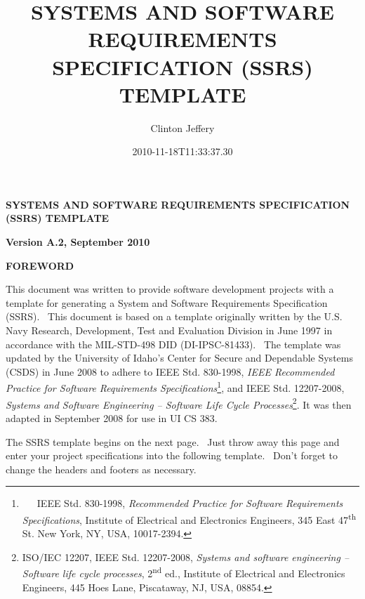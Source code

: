 \documentclass[twoside,letterpaper]{article}
\title{SYSTEMS AND SOFTWARE REQUIREMENTS SPECIFICATION (SSRS) TEMPLATE}
\author{Clinton Jeffery}
\date{2010-11-18T11:33:37.30}
\begin{document}
\clearpage\setcounter{page}{1}\pagestyle{Standard}
\thispagestyle{FirstPage}

\bigskip

{\centering{}\bfseries\color{black}
SYSTEMS AND SOFTWARE REQUIREMENTS SPECIFICATION (SSRS) TEMPLATE
\par}


\bigskip

{\centering{}\bfseries\color{black}
Version A.2, September 2010
\par}


\bigskip

{\centering{}\bfseries\color{black}
FOREWORD
\par}


\bigskip

{\color{black}
This document was written to provide software development projects with
a template for generating a System and Software Requirements
Specification (SSRS). \ This document is based on a template originally
written by the U.S. Navy Research, Development, Test and Evaluation
Division in June 1997 in accordance with the MIL-STD-498 DID
(DI-IPSC-81433). \ The template was updated by the University of
Idaho{\textquoteright}s Center for Secure and Dependable Systems (CSDS)
in June 2008 to adhere to IEEE Std. 830-1998, \textit{IEEE Recommended
Practice for Software Requirements
Specifications}\footnote{\foreignlanguage{english}{\ \ \ IEEE Std.
830-1998, }\foreignlanguage{english}{\textit{Recommended Practice for
Software Requirements Specifications}}\foreignlanguage{english}{,
Institute of Electrical and Electronics Engineers, 345 East
47}\foreignlanguage{english}{\textsuperscript{th}}\foreignlanguage{english}{
St. New York, NY, USA, 10017-2394.}}, and IEEE Std. 12207-2008,
\textit{Systems and Software Engineering -- Software Life Cycle
Processes}\footnote{\foreignlanguage{english}{ISO/IEC 12207, IEEE Std.
12207-2008, }\foreignlanguage{english}{\textit{Systems and software
engineering -- Software life cycle
processes}}\foreignlanguage{english}{,
2}\foreignlanguage{english}{\textsuperscript{nd}}\foreignlanguage{english}{
ed., Institute of Electrical and Electronics Engineers, 445 Hoes Lane,
Piscataway, NJ, USA, 08854.}}. It was then adapted in September 2008
for use in UI CS 383.}


\bigskip

{\color{black}
The SSRS template begins on the next page. \ Just throw away this page
and enter your project specifications into the following template.
\ Don{\textquoteright}t forget to change the headers and footers as
necessary.}
\end{document}
